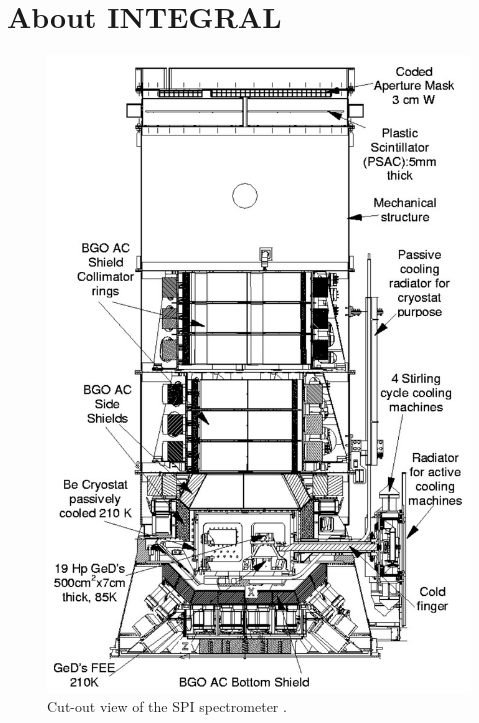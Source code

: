 \documentclass{report}
\begin{document}
\section{About INTEGRAL}


\begin{figure}
  \includegraphics[width=\linewidth]{Images/General/SPI_cut_view_verdenne_2003.PNG}
  \vspace{-20pt}
  \caption{Cut-out view of the SPI spectrometer \cite{refId0}.}
  \vspace{-20pt}
  \label{SPI cut view}
\end{figure}
\end{document}
